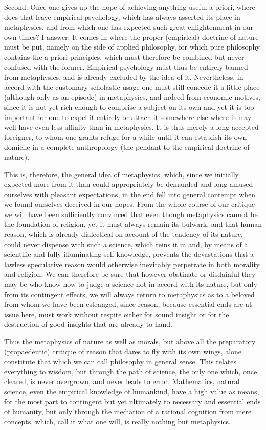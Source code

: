 \documentclass{article}
\begin{document}
Second: Once one gives up the hope of achieving anything useful a priori, 
where does that leave empirical psychology,
which has always asserted its place in metaphysics,
and from which one has expected such great enlightenment in our own times?
I answer: It comes in where the proper (empirical) doctrine of nature must be put,
namely on the side of applied philosophy,
for which pure philosophy contains the a priori principles,
which must therefore be combined but never confused with the former.
Empirical psychology must thus be entirely banned from metaphysics,
and is already excluded by the idea of it.
Nevertheless, in accord with the customary scholastic usage
one must still concede it a little place
(although only as an episode) in metaphysics,
and indeed from economic motives,
since it is not yet rich enough to comprise a subject on its own
and yet it is too important for one to expel it entirely
or attach it somewhere else where it may well have 
even less affinity than in metaphysics. 
It is thus merely a long-accepted foreigner,
to whom one grants refuge for a while until it can establish
its own domicile in a complete anthropology
(the pendant to the empirical doctrine of nature).

This is, therefore, the general idea of metaphysics, which,
since we initially expected more from it than could appropriately be demanded
and long amused ourselves with pleasant expectations, 
in the end fell into general contempt when we found ourselves deceived in our hopes.
From the whole course of our critique we will have been sufficiently convinced
that even though metaphysics cannot be the foundation of religion, 
yet it must always remain its bulwark, and that human reason,
which is already dialectical on account of the tendency of its nature,
could never dispense with such a science, which reins it in
and, by means of a scientific and fully illuminating self-knowledge,
prevents the devastations that a lawless speculative reason 
would otherwise inevitably perpetrate in both morality and religion.
We can therefore be sure that however obstinate or disdainful they may be 
who know how to judge a science not in accord with its nature,
but only from its contingent effects,
we will always return to metaphysics as to a beloved
from whom we have been estranged,
since reason, because essential ends are at issue here,
must work without respite either for sound insight
or for the destruction of good insights that are already to hand.

Thus the metaphysics of nature as well as morals,
but above all the preparatory (propaedeutic) critique of reason
that dares to fly with its own wings, alone constitute
that which we can call philosophy in general sense.
This relates everything to wisdom, but through the path of science,
the only one which, once cleared, is never overgrown, and never leads to error.
Mathematics, natural science, even the empirical knowledge of humankind,
have a high value as means, for the most part to contingent
but yet ultimately to necessary and essential ends of humanity,
but only through the mediation of a rational cognition from mere concepts,
which, call it what one will, is really nothing but metaphysics.
\end{document}

